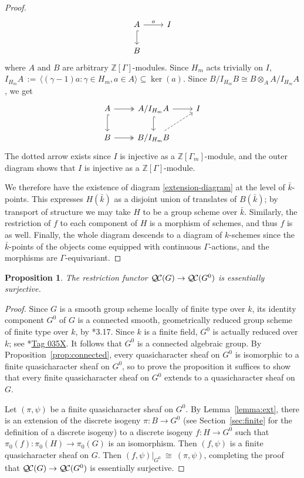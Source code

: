 \documentclass[11pt]{amsart}
\theoremstyle{plain}
\newtheorem{proposition}[theorem]{Proposition}
\theoremstyle{definition}
\theoremstyle{remark}
\newcommand{\ZZ}{{\mathbb{Z}}}
\newcommand{\bFq}{\bar{k}}
\newcommand{\Fq}{k}
\newcommand{\ceq}{{\, :=\, }}
\newcommand{\iso}{{\ \cong\ }}
\newcommand{\QC}{{\mathcal{Q\hskip-0.8pt C}}}
\begin{document}
\begin{proof}
  \[
  \begin{tikzcd}
  A \rar{a} \arrow[hook]{d} & I \\
  B
  \end{tikzcd}
  \]
  where $A$ and $B$ are arbitrary $\ZZ[\Gamma]$-modules.  Since $H_m$ acts trivially on $I$,
  $I_{H_m}A \ceq \langle (\gamma-1)a : \gamma \in H_m, a \in A \rangle \subseteq \ker(a).$
  Since $B / I_{H_m}B \cong B \otimes_A A / I_{H_m}A$, we get
  \[
  \begin{tikzcd}
  A \arrow[two heads]{r} \arrow[hook]{d} & A/I_{H_m}A \rar \arrow[hook]{d} & I \\
  B \arrow[two heads]{r} & B/I_{H_m}B \arrow[dashed]{ur} & {}
  \end{tikzcd}
  \]
  The dotted arrow exists since $I$ is injective as a
  $\ZZ[\Gamma_m]$-module, and the outer diagram shows that $I$ is
  injective as a $\ZZ[\Gamma]$-module.

  We therefore have the existence of diagram \eqref{extension-diagram}
  at the level of $\bFq$-points.  This expresses $H(\bFq)$ as a
  disjoint union of translates of $B(\bFq)$; by transport of structure
  we may take $H$ to be a group scheme over $\bFq$.  Similarly, the
  restriction of $f$ to each component of $H$ is a morphism of
  schemes, and thus $f$ is as well.  Finally, the whole diagram
  descends to a diagram of $\Fq$-schemes since the $\bFq$-points of
  the objects come equipped with continuous $\Gamma$-actions, and the
  morphisms are $\Gamma$-equivariant.
\end{proof}

\begin{proposition}\label{prop:restriction}
  The restriction functor $\QC(G)\to \QC(G^0)$ is essentially surjective.
\end{proposition}

\begin{proof}
  Since $G$ is a smooth group scheme locally of finite type over $\Fq$, its
  identity component $G^0$ of $G$ is a connected smooth, 
  geometrically reduced group scheme of finite type over $\Fq$, by
   \cite{vdGeer-Moonen:AbelianVarieties}*{3.17}. 
	Since $\Fq$ is a finite field, $G^0$ is actually reduced over $\Fq$;
	see \cite{stacks-project}*{\href{http://stacks.math.columbia.edu/tag/035X}{Tag 035X}}.
	It follows that $G^0$ is a connected algebraic group.
    By Proposition~\ref{prop:connected}, every
  quasicharacter sheaf on $G^0$ is isomorphic to a 
  finite quasicharacter sheaf on $G^0$, 
  so to prove the proposition it suffices to show that every 
  finite quasicharacter sheaf on $G^0$ extends to a quasicharacter sheaf on $G$.
  
 Let $(\pi,\psi)$ be a finite quasicharacter sheaf on $G^0$.
 By Lemma~\ref{lemma:ext}, there is an extension of the 
 discrete isogeny $\pi : B \to G^0$ 
 (see Section~\ref{sec:finite} for the definition of a discrete isogeny) 
 to a discrete isogeny $f : H \to G^0$ 
 such that $\pi_0(f) : \pi_0(H)\to \pi_0(G)$ is an isomorphism.
 Then $(f,\psi)$ is a finite quasicharacter sheaf on $G$.
 Then $(f,\psi)\vert_{G^0} \iso (\pi,\psi)$,
 completing the proof that $\QC(G)\to \QC(G^0)$ is essentially surjective.
\end{proof}
\end{document}
